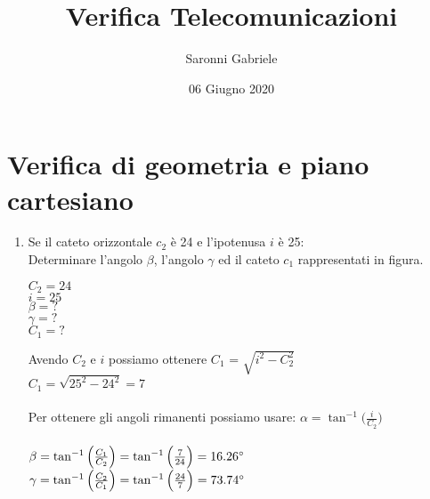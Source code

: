 \documentclass[fleqn]{exam}
\title{Verifica Telecomunicazioni}
\author{Saronni Gabriele}
\date{06 Giugno 2020}
\begin{document}
\begin{titlepage}
\maketitle
\end{titlepage}
\section{Verifica di geometria e piano cartesiano}
\begin{enumerate}
    \item Se il cateto orizzontale $c_2$ è 24 e l'ipotenusa $i$ è 25: \\
    Determinare l'angolo $\beta$, l'angolo $\gamma$ ed il cateto $c_1$ rappresentati in figura. \\
    
    \begin{center}
    \end{center}
	
    $C_2 = 24$ \\
    $i = 25$ \\
    $\beta = ?$ \\
    $\gamma = ?$ \\
    $C_1 = ?$

    Avendo $C_2$ e $i$ possiamo ottenere $C_1$ = $\sqrt{i^2-C_2^2}$ \\
    $C_1 = \sqrt{25^2-24^2} = 7$ \\
    \\ 
    Per ottenere gli angoli rimanenti possiamo usare: $\alpha = \tan^{-1}\Big(\frac{i}{C_2}\Big)$ \\
    \\ 
    $\beta = \tan^{-1}\Big(\frac{C_1}{C_2}\Big) = \tan^{-1}\Big(\frac{7}{24}\Big) = 16.26\degree$\\
    $\gamma = \tan^{-1}\Big(\frac{C_2}{C_1}\Big) = \tan^{-1}\Big(\frac{24}{7}\Big) = 73.74\degree$ 
    

\end{enumerate}
\end{document}

